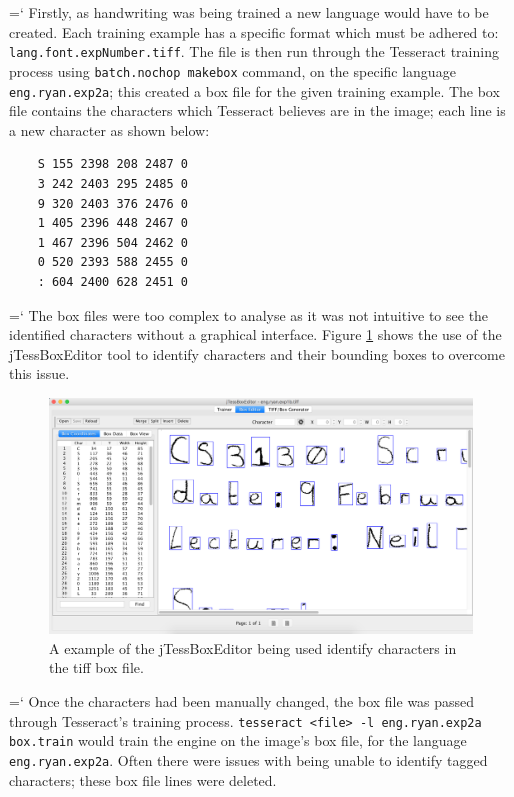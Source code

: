 {{\ttfamily \hyphenchar\the\font=`\-}%
Firstly, as handwriting was being trained a new language would have to be created. Each training example has a specific format which must be adhered to: \texttt{lang.font.expNumber.tiff}. The file is then run through the Tesseract training process using \texttt{batch.nochop makebox} command, on the specific language \texttt{eng.ryan.exp2a}; this created  a box file for the given training example. The box file contains the characters which Tesseract believes are in the image; each line is a new character as shown below:
\begin{center}
  \begin{lstlisting}
    S 155 2398 208 2487 0
    3 242 2403 295 2485 0
    9 320 2403 376 2476 0
    1 405 2396 448 2467 0
    1 467 2396 504 2462 0
    0 520 2393 588 2455 0
    : 604 2400 628 2451 0
  \end{lstlisting}
\end{center}


{{\ttfamily \hyphenchar\the\font=`\-}%
The box files were too complex to analyse as it was not intuitive to see the identified characters without a graphical interface. Figure \ref{fig:box_editor} shows the use of the jTessBoxEditor \cite{citeulike:13926798} tool to identify characters and their bounding boxes to overcome this issue.

\begin{figure}[H]
  \centering
  \includegraphics[width=\textwidth]{images/box_editor}
  \caption{A example of the jTessBoxEditor being used identify characters in the tiff box file.}
  \label{fig:box_editor}
\end{figure}

{{\ttfamily \hyphenchar\the\font=`\-}%
Once the characters had been manually changed, the box file was passed through Tesseract's training process. \texttt{tesseract <file> -l eng.ryan.exp2a box.train} would train the engine on the image's box file, for the language \texttt{eng.ryan.exp2a}. Often there were issues with being unable to identify tagged characters; these box file lines were deleted.

}}}
